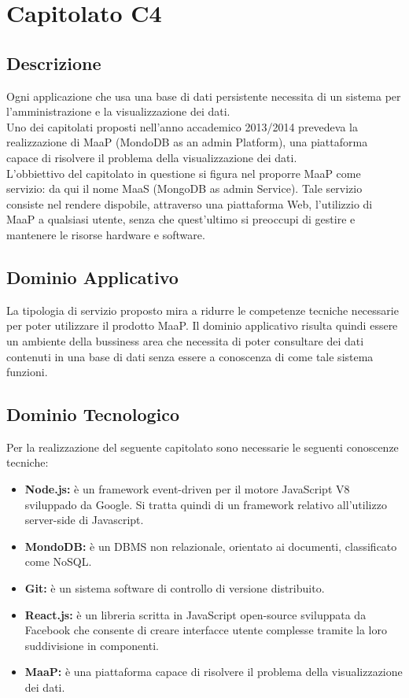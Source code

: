 \section{Capitolato C4}
\subsection{Descrizione}
Ogni applicazione che usa una base di dati persistente necessita di un sistema per l'amministrazione e la visualizzazione dei dati.\\ Uno dei capitolati proposti nell'anno accademico 2013/2014 prevedeva la realizzazione di MaaP (MondoDB as an admin Platform), una piattaforma capace di risolvere il problema della visualizzazione dei dati.\\ 
L'obbiettivo del capitolato in questione si figura nel proporre MaaP come servizio: da qui il nome MaaS (MongoDB as admin Service). Tale servizio consiste nel rendere dispobile, attraverso una piattaforma Web, l'utilizzio di MaaP a qualsiasi utente, senza che quest'ultimo si preoccupi di gestire e mantenere le risorse hardware e software. 

\subsection{Dominio Applicativo}
La tipologia di servizio proposto mira a ridurre le competenze tecniche necessarie per poter utilizzare il prodotto MaaP. Il dominio applicativo risulta quindi essere un ambiente della bussiness area che necessita di poter consultare dei dati contenuti in una base di dati senza essere a conoscenza di come tale sistema funzioni. 

\subsection{Dominio Tecnologico}
Per la realizzazione del seguente capitolato sono necessarie le seguenti conoscenze tecniche:
\begin{itemize}
	\item \textbf{Node.js:} è un framework event-driven per il motore JavaScript V8 sviluppado da Google. Si tratta quindi di un framework relativo all'utilizzo server-side di Javascript. 
	\item \textbf{MondoDB:} è un DBMS non relazionale, orientato ai documenti, classificato come NoSQL. 
	\item \textbf{Git:} è un sistema software di controllo di versione distribuito. 
	\item \textbf{React.js:} è un libreria scritta in JavaScript open-source sviluppata da Facebook che consente di creare interfacce utente complesse tramite la loro suddivisione in componenti. 
	\item \textbf{MaaP:} è una piattaforma capace di risolvere il problema della visualizzazione dei dati.	
\end{itemize}

